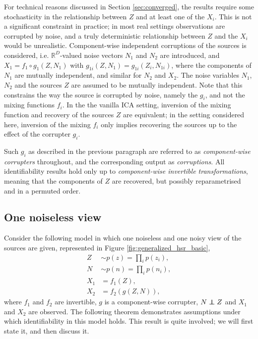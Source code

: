 For technical reasons discussed in Section
\ref{sec:converged}, the results require some stochasticity in the relationship between $Z$ and at least one of the $X_i$.
This is not a significant constraint in practice; in most real settings observations are corrupted by noise, and a truly deterministic relationship between $Z$ and the $X_i$ would be unrealistic.
Component-wise independent corruptions of the sources is considered, i.e. $\mathbb{R}^D$-valued noise vectors $N_1$ and $N_2$ are introduced, and $X_1 = f_1 \circ g_1(Z, N_1)$ with $g_{1i}(Z, N_1) = g_{1i}(Z_i, N_{1i})$, where the components of $N_{1}$ are mutually independent, and similar for $N_2$ and $X_2$. 
The noise variables $N_1$, $N_2$ and the sources $Z$ are assumed to be mutually independent.
Note that this constrains the way the source is corrupted by noise, namely the $g_i$, and not the mixing functions $f_i$.
In the the vanilla ICA setting, inversion of the mixing function and recovery of the sources $Z$ are equivalent; in the setting considered here, inversion of the mixing $f_i$ only implies recovering the sources up to the effect of the corrupter $g_i$.

Such $g_i$ as described in the previous paragraph are referred to as \emph{component-wise corrupters} throughout, and the corresponding output as \emph{corruptions}. 
All identifiability results hold only up to \emph{component-wise invertible transformations}, meaning that the components of $Z$ are recovered, but possibly reparametrised and in a permuted order. 





\subsection{One noiseless view}
\label{sec:onenoisless}
Consider the following model in which one noiseless and one noisy view of the sources are given, represented in Figure \ref{fig:generalized_hsr_basic}, 
%
\begin{align}
Z &\sim p(z) = \prod_{i} p(z_i), \label{eq:indep}\\
N &\sim p(n) = \prod_{i} p(n_i), \nonumber  \\
X_{1}&= f_{1}(Z) \label{eq:sem2_1}, \\
X_{2}&= f_{2}( g(Z, N)) \label{eq:sem2_2},
\end{align}
%
where $f_1$ and $f_2$ are invertible, $g$ is a component-wise corrupter, $N \independent Z$ and $X_1$ and $X_2$ are observed.
The following theorem demonstrates assumptions under which identifiability in this model holds.
This result is quite involved; we will first state it, and then discuss it.

